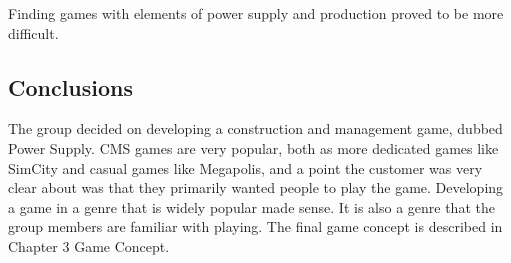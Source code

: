 Finding games with elements of power supply and production proved to be more difficult.

\subsection{Conclusions}

The group decided on developing a construction and management game, dubbed Power Supply. CMS games are very popular, both as more dedicated games like SimCity and casual games like Megapolis, and a point the customer was very clear about was that they primarily wanted people to play the game. Developing a game in a genre that is widely popular made sense. It is also a genre that the group members are familiar with playing. The final game concept is described in Chapter 3 Game Concept.
